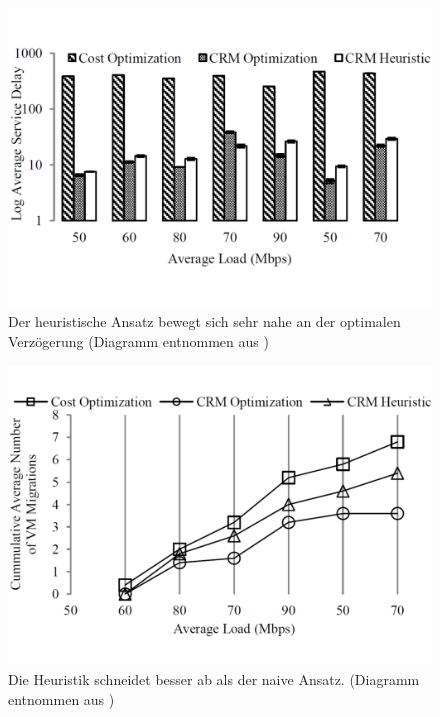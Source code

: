\documentclass[conference]{IEEEtran}
\begin{document}
\begin{figure}[ht]
	\centering
	\includegraphics[trim=0 3cm 0 1.5cm,scale=0.25]{grafik/delay.pdf}
	\caption{Der heuristische Ansatz bewegt sich sehr nahe an der optimalen Verzögerung
	(Diagramm entnommen aus \cite{IEEEhowto:orig})}
	\label{img:delay}
\end{figure}


\begin{figure}[ht]
	\centering
	\includegraphics[trim=0 3cm 0 1.5cm,scale=0.25]{grafik/VMMIG.pdf}
	\caption{Die Heuristik schneidet besser ab als der naive Ansatz.
	(Diagramm entnommen aus \cite{IEEEhowto:orig})}
	\label{img:VMMIG}
\end{figure}
\end{document}
